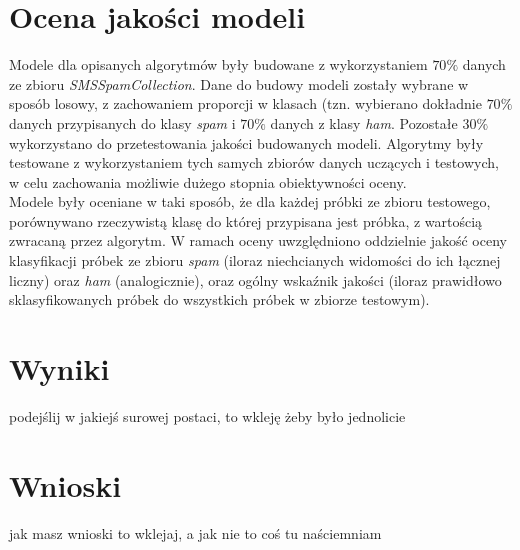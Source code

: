 \documentclass[a4paper,12pt]{article}
\begin{document}
\section{Ocena jakości modeli} %

Modele dla opisanych algorytmów były budowane z wykorzystaniem $70\%$ danych ze zbioru \textit{SMSSpamCollection}. Dane do budowy modeli zostały
wybrane w sposób losowy, z zachowaniem proporcji w klasach (tzn. wybierano dokładnie $70\%$ danych przypisanych do klasy \textit{spam} i $70\%$ 
danych z klasy \textit{ham}. Pozostałe $30\%$ wykorzystano do przetestowania jakości budowanych modeli. Algorytmy były testowane z wykorzystaniem
tych samych zbiorów danych uczących i testowych, w celu zachowania możliwie dużego stopnia obiektywności oceny.\\

Modele były oceniane w taki sposób, że dla każdej próbki ze zbioru testowego, porównywano rzeczywistą klasę do której przypisana jest próbka, z
wartością zwracaną przez algorytm. W ramach oceny uwzględniono oddzielnie jakość oceny klasyfikacji próbek ze zbioru \textit{spam} (iloraz niechcianych widomości do ich łącznej liczny) oraz \textit{ham} (analogicznie), oraz ogólny wskaźnik jakości (iloraz prawidłowo sklasyfikowanych próbek do wszystkich próbek w zbiorze testowym).

\section{Wyniki}

podejślij w jakiejś surowej postaci, to wkleję żeby było jednolicie

\section{Wnioski}

jak masz wnioski to wklejaj, a jak nie to coś tu naściemniam
\end{document}
